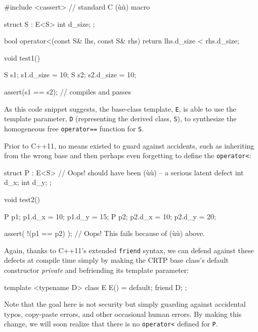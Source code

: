 \begin{emcppshiddenlisting}[emcppsbatch={e5,e6}]
#include <cassert>  // standard C (ù{}ù) macro
\end{emcppshiddenlisting}

\begin{emcppslisting}[emcppsbatch=e5]
struct S : E<S>
{
    int d_size;
};

bool operator<(const S& lhs, const S& rhs)
{
    return lhs.d_size < rhs.d_size;
}

void test1()
{
    S s1; s1.d_size = 10;
    S s2; s2.d_size = 10;

    assert(s1 == s2);  // compiles and passes
}
\end{emcppslisting}

\noindent As this code snippet suggests, the base-class template, \lstinline!E!, is
able to use the template parameter, \lstinline!D! (representing the derived
class, \lstinline!S!), to synthesize the homogeneous free
\lstinline!operator==! function for \lstinline!S!.

Prior to C++11, no means existed to guard against accidents, such as
inheriting from the wrong base and then perhaps even forgetting to
define the \lstinline!operator<!:

\begin{emcppslisting}[emcppsbatch=e5]
struct P : E<S>  // Oops! should have been (ù{}ù) -- a serious latent defect
{
    int d_x;
    int d_y;
};

void test2()
{
    P p1; p1.d_x = 10; p1.d_y = 15;
    P p2; p2.d_x = 10; p2.d_y = 20;

    assert( !(p1 == p2) );  // Oops! This fails because of (ù{}ù) above.
}
\end{emcppslisting}

\noindent Again, thanks to C++11's extended \lstinline!friend! syntax, we can defend
against these defects at compile time simply by making the CRTP base
class's default constructor \emph{private} and befriending its template
parameter:

\begin{emcppslisting}
template <typename D>
class E
{
     E() = default;
     friend D;
};
\end{emcppslisting}

\noindent Note that the goal here is not security but simply guarding against
accidental typos, copy-paste errors, and other occasional  human errors. By making this change, we will soon realize that there
is no \lstinline!operator<! defined for \lstinline!P!.

